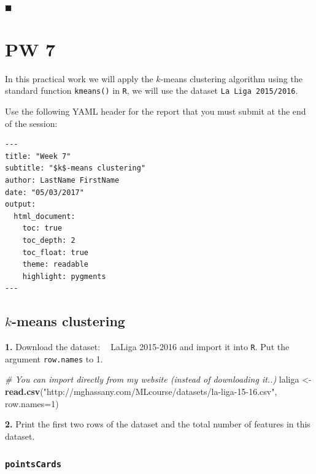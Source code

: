 \documentclass[]{book}
\newenvironment{Shaded}{\begin{snugshade}}{\end{snugshade}}
\newcommand{\KeywordTok}[1]{\textcolor[rgb]{0.13,0.29,0.53}{\textbf{#1}}}
\newcommand{\DataTypeTok}[1]{\textcolor[rgb]{0.13,0.29,0.53}{#1}}
\newcommand{\DecValTok}[1]{\textcolor[rgb]{0.00,0.00,0.81}{#1}}
\newcommand{\StringTok}[1]{\textcolor[rgb]{0.31,0.60,0.02}{#1}}
\newcommand{\CommentTok}[1]{\textcolor[rgb]{0.56,0.35,0.01}{\textit{#1}}}
\newcommand{\NormalTok}[1]{#1}
\begin{document}
◼

\chapter*{PW 7}\label{pw-7}

In this practical work we will apply the \(k\)-means clustering
algorithm using the standard function \texttt{kmeans()} in \texttt{R},
we will use the dataset \texttt{La\ Liga\ 2015/2016}.

Use the following YAML header for the report that you must submit at the
end of the session:

\begin{verbatim}
---
title: "Week 7"
subtitle: "$k$-means clustering"
author: LastName FirstName
date: "05/03/2017"
output:
  html_document:
    toc: true
    toc_depth: 2
    toc_float: true
    theme: readable
    highlight: pygments
---
\end{verbatim}

\section*{\texorpdfstring{\(k\)-means
clustering}{k-means clustering}}\label{k-means-clustering}

\textbf{1.} Download the dataset:
\textcolor{white}{[}\faTable\textcolor{white}{]} LaLiga 2015-2016 and
import it into \texttt{R}. Put the argument \texttt{row.names} to 1.

\begin{Shaded}
\begin{Highlighting}[]
\CommentTok{# You can import directly from my website (instead of downloading it..)}
\NormalTok{laliga <-}\StringTok{ }\KeywordTok{read.csv}\NormalTok{(}\StringTok{"http://mghassany.com/MLcourse/datasets/la-liga-15-16.csv"}\NormalTok{, }\DataTypeTok{row.names=}\DecValTok{1}\NormalTok{)}
\end{Highlighting}
\end{Shaded}

\textbf{2.} Print the first two rows of the dataset and the total number
of features in this dataset.

\subsection*{\texorpdfstring{\texttt{pointsCards}}{pointsCards}}\label{pointscards}
\end{document}
